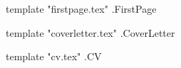 \documentclass[11pt]{article}
\begin{document}
\normalfont

%
%
%
%

{{template "firstpage.tex" .FirstPage}}

\newpage

{{template "coverletter.tex" .CoverLetter}}

\newpage

{{template "cv.tex" .CV}}
\end{document}
